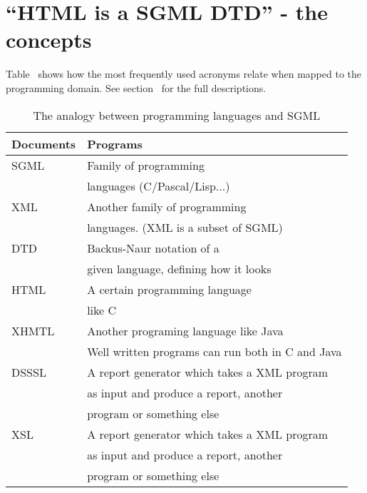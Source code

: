 \section{``HTML is a SGML DTD'' - the concepts}

Table~ shows how the most
frequently used acronyms relate when mapped to the programming domain.
See section~ for the full descriptions.


\begin{table}[htbp]
  \begin{center}
    \begin{tabular}{|l|l|}
      \hline\hline
      \textbf{Documents} &  \textbf{Programs} \\
      \hline
      SGML &Family of programming \\
           & languages  (C/Pascal/Lisp...) \\
      \hline
      XML  & Another family of programming \\
           & languages. (XML is a subset of SGML) \\
      \hline
      DTD  & \textsf{Backus}-Naur notation of a \\
           & given language, defining how it looks\\
      \hline
      HTML & A certain programming language\\
           & like C \\
      \hline
      XHMTL & Another programing language like Java \\
           & Well written programs can run both in C and Java\\
      \hline
      DSSSL & A report generator which takes a XML program \\
           & as input and produce a report, another\\
           & program or something else \\
      \hline
      XSL  & A report generator which takes a XML program \\
           & as input and produce a report, another\\
           & program or something else \\
      \hline
    \end{tabular}
    \caption{The analogy between programming languages and SGML}
    \label{tab:programming-langugages-and-html}
  \end{center}
\end{table}

